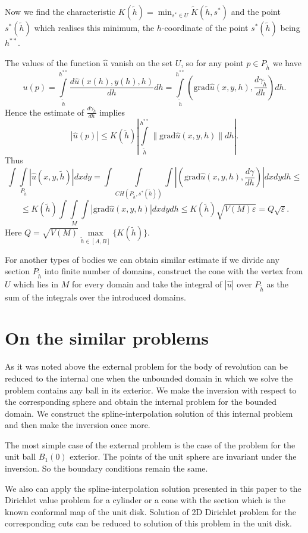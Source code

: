 \documentclass{amsart}
\begin{document}
Now we find the characteristic $K(\tilde{h})=\min_{s^*\in U}
\tilde{K}(\tilde{h},s^*)$ and the point $s^*(\tilde{h})$ which
realises this minimum, the $h$-coordinate of the point
$s^*(\tilde{h})$ being $h^{**}$.

The values of the function $\hat{u}$ vanish on the set $U$, so for
any point $p\in P_{\tilde{h}}$ we have
$$
u(p)=\int\limits_{\tilde{h}}^{h^{**}} \frac{d \hat{u}(x(h), y(h),
h)}{dh} dh=\int\limits_{\tilde{h}}^{h^{**}} (\mathrm{grad}
\hat{u}(x, y, h), \frac{d\gamma_{\tilde{h}}}{dh}) dh.
$$
Hence the estimate of $\frac{d\gamma_{\tilde{h}}}{d h}$ implies
$$
|\hat{u}(p)|\leq K(\tilde{h}) |\int\limits_{\tilde{h}}^{h^{**}}
\|\mathrm{grad} \hat{u}(x, y, h)\| dh|.
$$
Thus
$$
\int\int\limits_{P_{\tilde{h}}} |\hat{u}(x,y,\tilde{h})| dx
dy=\int\int\limits_{CH(P_{\tilde{h}},s^*(\tilde{h}))}\int
|(\mathrm{grad} \hat{u}(x, y, h), \frac{d\gamma}{dh})| dx dy d h
\leq
$$
$$
\leq K(\tilde{h}) \int\int\limits_{M}\int |\mathrm{grad}
\hat{u}(x,y,h)|dx dy dh \leq K(\tilde{h}) \sqrt{V(M) \varepsilon} =
Q \sqrt{\varepsilon}.
$$
Here $Q=\sqrt{V(M)}\max\limits_{\tilde{h} \in [A,
B]}\{K(\tilde{h})\}$.


For another types of bodies we can obtain similar estimate if we
divide any section $P_{\tilde{h}}$ into finite number of domains,
construct the cone with the vertex from $U$ which lies in $M$ for
every domain and take the integral of $|\hat{u}|$ over
$P_{\tilde{h}}$ as the sum of the integrals over the introduced
domains.



\section{On the similar problems}

As it was noted above the external problem for the body of
revolution can be reduced to the internal one when the unbounded
domain in which we solve the problem contains any ball in its
exterior. We make the inversion with respect to the corresponding
sphere and obtain the internal problem for the bounded domain. We
construct the spline-interpolation solution of this internal problem
and then make the inversion once more.

The most simple case of the external problem is the case of the
problem for the  unit ball $B_1(0)$ exterior. The points of the unit
sphere are invariant under the inversion. So the boundary conditions
remain the same.


We also can apply the spline-interpolation solution presented in
this paper to the Dirichlet value problem for a cylinder or a cone
with the section which is the known conformal map of the unit disk.
Solution of 2D Dirichlet problem for the corresponding cuts can be
reduced to solution of this problem in the unit disk.
\end{document}
